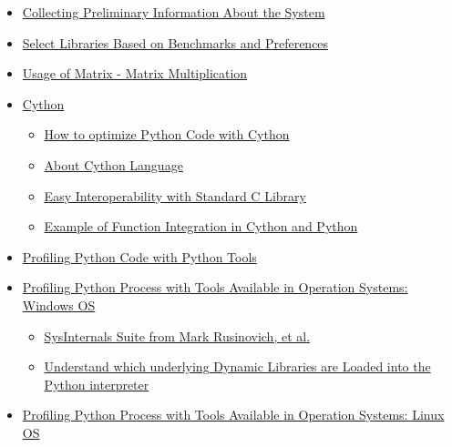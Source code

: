 \documentclass[
]{article}
\begin{document}
\begin{itemize}
  \begin{itemize}
  \item
    \protect\hyperlink{collecting-preliminary-information-about-the-system}{Collecting
    Preliminary Information About the System}
  \item
    \protect\hyperlink{select-libraries-based-on-benchmarks-and-preferences}{Select
    Libraries Based on Benchmarks and Preferences}
  \item
    \protect\hyperlink{usage-of-matrix-matrix-multiplication}{Usage of
    Matrix - Matrix Multiplication}
  \item
    \protect\hyperlink{cython}{Cython}

    \begin{itemize}
    \item
      \protect\hyperlink{how-to-optimize-python-code-with-cython}{How to
      optimize Python Code with Cython}
    \item
      \protect\hyperlink{about-cython-language}{About Cython Language}
    \item
      \protect\hyperlink{easy-interoperability-with-standard-c-library}{Easy
      Interoperability with Standard C Library}
    \item
      \protect\hyperlink{example-of-function-integration-in-cython-and-python}{Example
      of Function Integration in Cython and Python}
    \end{itemize}
  \item
    \protect\hyperlink{profiling-python-code-with-python-tools}{Profiling
    Python Code with Python Tools}
  \item
    \protect\hyperlink{profiling-python-process-with-tools-available-in-operation-systems--windows-os}{Profiling
    Python Process with Tools Available in Operation Systems: Windows
    OS}

    \begin{itemize}
    \item
      \protect\hyperlink{sysinternals-suite-from-mark-rusinovich--et-al}{SysInternals
      Suite from Mark Rusinovich, et al.}
    \item
      \protect\hyperlink{understand-which-underlying-dynamic-libraries-are-loaded-into-the-python-interpreter}{Understand
      which underlying Dynamic Libraries are Loaded into the Python
      interpreter}
    \end{itemize}
  \item
    \protect\hyperlink{profiling-python-process-with-tools-available-in-operation-systems--linux-os}{Profiling
    Python Process with Tools Available in Operation Systems: Linux OS}


\end{itemize}
\end{itemize}
\end{document}
